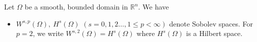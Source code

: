 \notations
{}
\label{Sec:Notations}
Let $\Omega$ be a smooth, bounded domain in ${\mathbb R}^n$. We have 
\begin{itemize}
\item $W^{s,p}(\Omega), ~H^s(\Omega)$ $(s=0,1,2\ldots, 1\leq p < \infty)$ denote Sobolev spaces. For $p=2$, we write $W^{s,2}(\Omega)=H^s(\Omega)$ where $H^s(\Omega)$ is a Hilbert space.
\end{itemize}